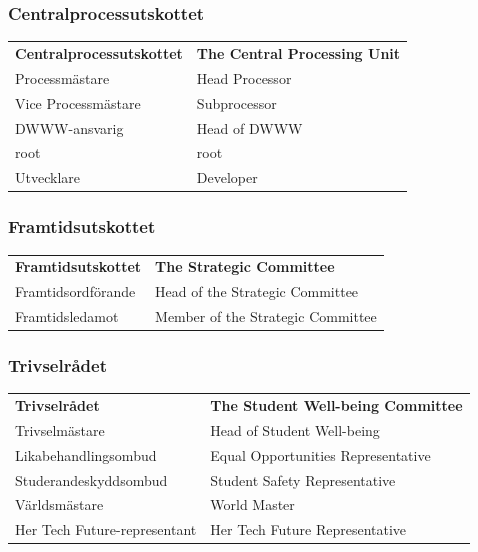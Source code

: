 \documentclass{dsekprotokoll}
\begin{document}
\subsubsection*{Centralprocessutskottet}
\vspace{12pt}
\begin{center}
    \begin{tabular}{R{6.5cm}|L{6.5cm}}
        \textbf{Centralprocessutskottet} & \textbf{The Central Processing Unit}\\
        Processmästare & Head Processor\\
        Vice Processmästare & Subprocessor\\
        DWWW-ansvarig & Head of DWWW\\
        root & root\\
        Utvecklare & Developer\\
    \end{tabular}
\end{center}


\subsubsection*{Framtidsutskottet}
\vspace{12pt}
\begin{center}
    \begin{tabular}{R{6.5cm}|L{6.5cm}}
        \textbf{Framtidsutskottet} & \textbf{The Strategic Committee}\\
        Framtidsordförande & Head of the Strategic Committee\\
        Framtidsledamot & Member of the Strategic Committee\\
    \end{tabular}
\end{center}


\subsubsection*{Trivselrådet}
\vspace{12pt}
\begin{center}
    \begin{tabular}{R{6.5cm}|L{6.5cm}}
        \textbf{Trivselrådet} & \textbf{The Student Well-being Committee}\\
        Trivselmästare & Head of Student Well-being\\
        Likabehandlingsombud & Equal Opportunities Representative\\
        Studerandeskyddsombud & Student Safety Representative\\
        Världsmästare & World Master\\
        Her Tech Future-representant & Her Tech Future Representative\\
    \end{tabular}
\end{center}
\end{document}
